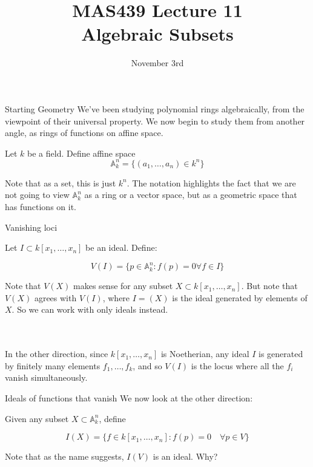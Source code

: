 \documentclass{beamer}
\title{MAS439 Lecture 11 \\ Algebraic Subsets}
\date{November 3rd}
\newcommand{\AAA}{\mathbb{A}}
\begin{document}
\begin{frame}
\titlepage
\end{frame}

\begin{frame}{Starting Geometry}
We've been studying polynomial rings algebraically, from the viewpoint of their universal property.  We now begin to study them from another angle, as rings of functions on affine space.

\begin{definition} Let $k$ be a field.  Define affine space
$$\AAA_k^n=\{(a_1,\dots, a_n)\in k^n\}$$
\end{definition} 

Note that as a set, this is just $k^n$.  The notation highlights the fact that we are not going to view $\AAA_k^n$ as a ring or a vector space, but as a geometric space that has functions on it.

\end{frame}


\begin{frame}{Vanishing loci}

\begin{definition} Let $I\subset k[x_1,\dots, x_n]$ be an ideal.  Define:

$$V(I)=\{p\in \AAA^n_k:f(p)=0\forall f\in I\}$$
\end{definition}

Note that $V(X)$ makes sense for any subset $X\subset k[x_1,\dots, x_n]$.  But note that $V(X)$ agrees with $V(I)$, where $I=(X)$ is the ideal generated by elements of $X$.  So we can work with only ideals instead.

\\~\\

In the other direction, since $k[x_1,\dots, x_n]$ is Noetherian, any ideal $I$ is generated by finitely many elements $f_1,\dots, f_k$, and so $V(I)$ is the locus where all the $f_i$ vanish simultaneously.

\end{frame}


\begin{frame}{Ideals of functions that vanish}
We now look at the other direction:

\begin{definition}
Given any subset $X\subset \AAA_k^n$, define

$$I(X)=\{f\in k[x_1,\dots, x_n]:f(p)=0\quad\forall p\in V\}$$

\end{definition}

Note that as the name suggests, $I(V)$ is an ideal.  Why?


\end{frame}
\end{document}
